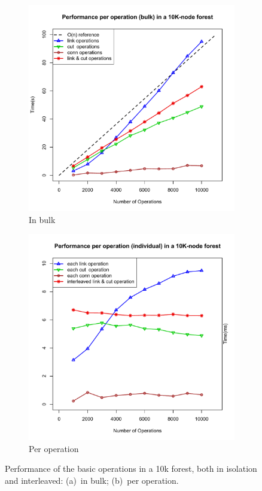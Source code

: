 \documentclass{elsarticle}
\begin{document}
\begin{figure}[H]
\centering
\begin{subfigure}{.5\textwidth}
  \centering
  \includegraphics[scale=0.38]{./Images/plotEach}
  \caption{In bulk}
\end{subfigure}%
\begin{subfigure}{.5\textwidth}
  \centering
  \includegraphics[scale=0.38]{./Images/plotOpsIndiv}
  \caption{Per operation}
\end{subfigure}
\caption{Performance of the basic operations in a 10k forest, both in isolation and interleaved: (a)~in bulk; (b)~per operation.}
\label{fig:EachOp}
\end{figure}
\end{document}

